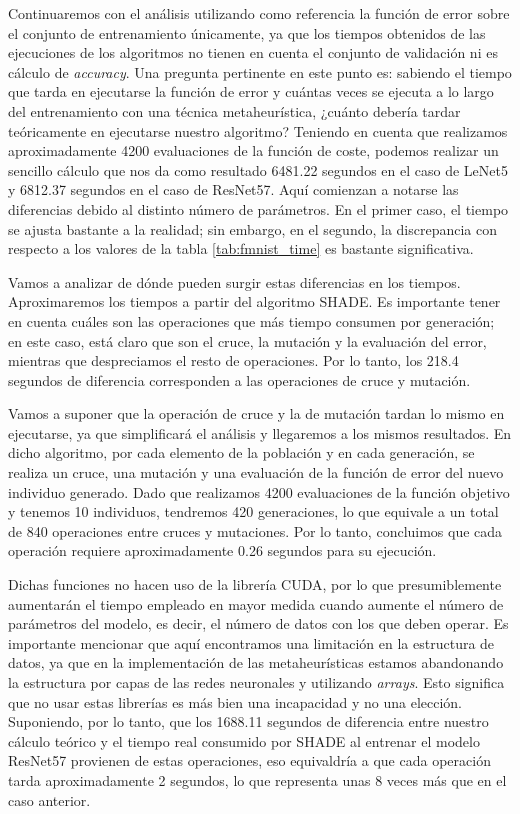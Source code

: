Continuaremos con el análisis utilizando como referencia la función de error sobre el conjunto de entrenamiento únicamente, ya que los tiempos obtenidos de las ejecuciones de los algoritmos no tienen en cuenta el conjunto de validación ni es cálculo de \textit{accuracy}. Una pregunta pertinente en este punto es: sabiendo el tiempo que tarda en ejecutarse la función de error y cuántas veces se ejecuta a lo largo del entrenamiento con una técnica metaheurística, ¿cuánto debería tardar teóricamente en ejecutarse nuestro algoritmo? Teniendo en cuenta que realizamos aproximadamente 4200 evaluaciones de la función de coste, podemos realizar un sencillo cálculo que nos da como resultado 6481.22 segundos en el caso de LeNet5 y 6812.37 segundos en el caso de ResNet57. Aquí comienzan a notarse las diferencias debido al distinto número de parámetros. En el primer caso, el tiempo se ajusta bastante a la realidad; sin embargo, en el segundo, la discrepancia con respecto a los valores de la tabla \ref{tab:fmnist_time} es bastante significativa.

Vamos a analizar de dónde pueden surgir estas diferencias en los tiempos. Aproximaremos los tiempos a partir del algoritmo SHADE. Es importante tener en cuenta cuáles son las operaciones que más tiempo consumen por generación; en este caso, está claro que son el cruce, la mutación y la evaluación del error, mientras que despreciamos el resto de operaciones. Por lo tanto, los 218.4 segundos de diferencia corresponden a las operaciones de cruce y mutación.

Vamos a suponer que la operación de cruce y la de mutación tardan lo mismo en ejecutarse, ya que simplificará el análisis y llegaremos a los mismos resultados. En dicho algoritmo, por cada elemento de la población y en cada generación, se realiza un cruce, una mutación y una evaluación de la función de error del nuevo individuo generado. Dado que realizamos 4200 evaluaciones de la función objetivo y tenemos 10 individuos, tendremos 420 generaciones, lo que equivale a un total de 840 operaciones entre cruces y mutaciones. Por lo tanto, concluimos que cada operación requiere aproximadamente 0.26 segundos para su ejecución.

Dichas funciones no hacen uso de la librería CUDA, por lo que presumiblemente aumentarán el tiempo empleado en mayor medida cuando aumente el número de parámetros del modelo, es decir, el número de datos con los que deben operar. Es importante mencionar que aquí encontramos una limitación en la estructura de datos, ya que en la implementación de las metaheurísticas estamos abandonando la estructura por capas de las redes neuronales y utilizando \textit{arrays}. Esto significa que no usar estas librerías es más bien una incapacidad y no una elección. Suponiendo, por lo tanto, que los 1688.11 segundos de diferencia entre nuestro cálculo teórico y el tiempo real consumido por SHADE al entrenar el modelo ResNet57 provienen de estas operaciones, eso equivaldría a que cada operación tarda aproximadamente 2 segundos, lo que representa unas 8 veces más que en el caso anterior.

